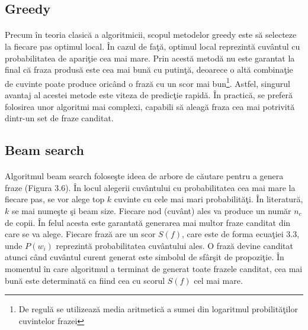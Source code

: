 \subsection{Greedy}

\paragraph{}
Precum \^ in teoria clasic\u a a algoritmicii, scopul metodelor greedy este s\u a selecteze la fiecare pas optimul local. \^ In cazul de fa\c t\u a, optimul local reprezint\u a cuv\^ antul cu probabilitatea de apari\c tie cea mai mare. Prin acest\u a metod\u a nu este garantat la final c\u a fraza produs\u a este cea mai bun\u a cu putin\c t\u a, deoarece o alt\u a combina\c tie de cuvinte poate produce oric\^ and o fraz\u a cu un scor mai bun\footnote{De regul\u a se utilizeaz\u a media aritmetic\u a a sumei din logaritmul probilit\u a\c tilor cuvintelor frazei}. Astfel, singurul avantaj al acestei metode este viteza de predic\c tie rapid\u a. \^ In practic\u a, se prefer\u a folosirea unor algoritmi mai complexi, capabili s\u a aleag\u a fraza cea mai potrivit\u a dintr-un set de fraze canditat.

\subsection{Beam search}

\paragraph{}
Algoritmul beam search folose\c ste ideea de arbore de c\u autare pentru a genera fraze (Figura 3.6). \^ In locul alegerii cuv\^ antului cu probabilitatea cea mai mare la fiecare pas, se vor alege top \(k\) cuvinte cu cele mai mari probabilit\u a\c ti. \^ In literatur\u a, \(k\) se mai nume\c ste \c si beam size. Fiecare nod (cuv\^ ant) ales va produce un num\u ar \(n_c\) de copii. \^ In felul acesta este garantat\u a generarea mai multor fraze canditat din care se va alege. Fiecare fraz\u a are un scor \(S(f)\), care este de forma ecua\c tiei 3.3, unde \(P(w_{i})\) reprezint\u a probabilitatea cuv\^ antului ales. O fraz\u a devine canditat atunci c\^ and cuv\^ antul curent generat este simbolul de sf\^ ar\c sit de propozi\c tie. \^ In momentul \^ in care algoritmul a terminat de generat toate frazele canditat, cea mai bun\u a este determinat\u a ca fiind cea cu scorul \(S(f)\) cel mai mare.\\

